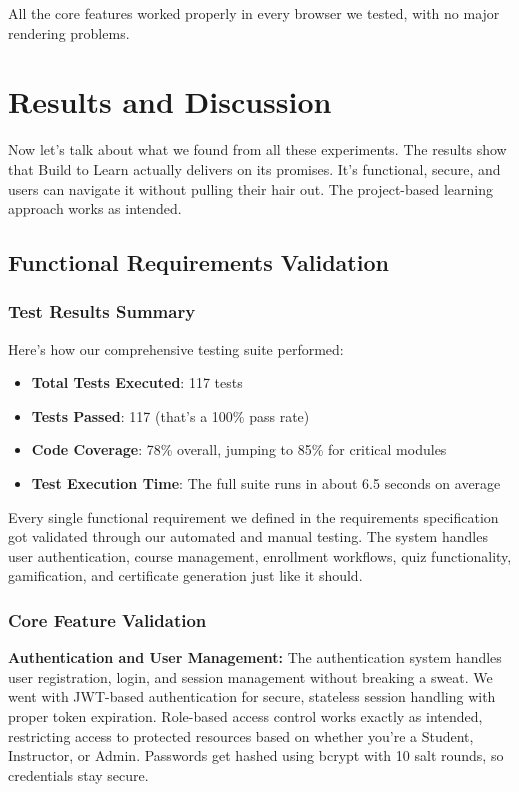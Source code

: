 \documentclass[final,3p,times,twocolumn]{elsarticle}
\begin{document}
All the core features worked properly in every browser we tested, with no major rendering problems.

\section{Results and Discussion}

Now let's talk about what we found from all these experiments. The results show that Build to Learn actually delivers on its promises. It's functional, secure, and users can navigate it without pulling their hair out. The project-based learning approach works as intended.

\subsection{Functional Requirements Validation}

\subsubsection{Test Results Summary}

Here's how our comprehensive testing suite performed:

\begin{itemize}
    \item \textbf{Total Tests Executed}: 117 tests
    \item \textbf{Tests Passed}: 117 (that's a 100\% pass rate)
    \item \textbf{Code Coverage}: 78\% overall, jumping to 85\% for critical modules
    \item \textbf{Test Execution Time}: The full suite runs in about 6.5 seconds on average
\end{itemize}

Every single functional requirement we defined in the requirements specification got validated through our automated and manual testing. The system handles user authentication, course management, enrollment workflows, quiz functionality, gamification, and certificate generation just like it should.

\subsubsection{Core Feature Validation}

\textbf{Authentication and User Management:} The authentication system handles user registration, login, and session management without breaking a sweat. We went with JWT-based authentication for secure, stateless session handling with proper token expiration. Role-based access control works exactly as intended, restricting access to protected resources based on whether you're a Student, Instructor, or Admin. Passwords get hashed using bcrypt with 10 salt rounds, so credentials stay secure.
\end{document}
